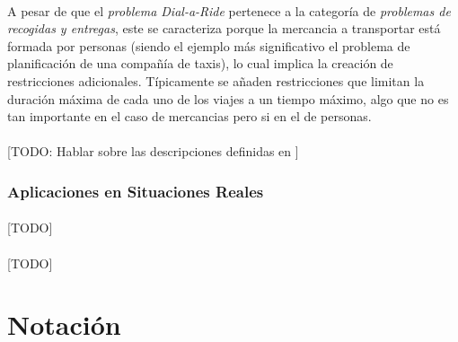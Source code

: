 \documentclass{subfiles}
\begin{document}
        \paragraph{}
        A pesar de que el \emph{problema Dial-a-Ride} pertenece a la categoría de \emph{problemas de recogidas y entregas}, este se caracteriza porque la mercancia a transportar está formada por personas (siendo el ejemplo más significativo el problema de planificación de una compañía de taxis), lo cual implica la creación de restricciones adicionales. Típicamente se añaden restricciones que limitan la duración máxima de cada uno de los viajes a un tiempo máximo, algo que no es tan importante en el caso de mercancias pero si en el de personas.

        \paragraph{}
        [TODO: Hablar sobre las descripciones definidas en \cite{cordeau2007dial}]

        \subsubsection{Aplicaciones en Situaciones Reales}
        \label{sec:formulation_dial_a_ride_applications}

          \paragraph{}
          [TODO]

        \paragraph{}
        [TODO]

    \section{Notación}
    \label{sec:formulation_notation}
\end{document}
